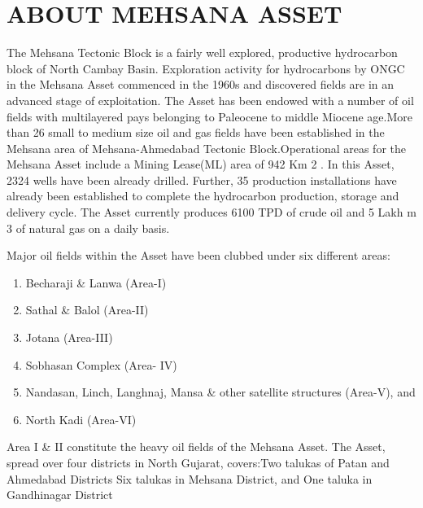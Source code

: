\chapter{ABOUT MEHSANA ASSET}

\onehalfspacing

The Mehsana Tectonic Block is a fairly well explored, productive hydrocarbon block of North Cambay Basin. Exploration activity for hydrocarbons by ONGC in the Mehsana Asset commenced in the 1960s and discovered fields are in an advanced stage of exploitation. The Asset has been endowed with a number of oil fields with multilayered pays belonging to Paleocene to middle Miocene age.More than 26 small to medium size oil and gas fields have been established in the Mehsana area of Mehsana-Ahmedabad Tectonic Block.Operational areas for the Mehsana Asset include a Mining Lease(ML) area of 942 Km 2 . In this Asset, 2324 wells have been already
drilled. Further, 35 production installations have already been established to complete the hydrocarbon production, storage and delivery cycle. The Asset currently produces 6100 TPD of crude oil and 5 Lakh m 3 of natural gas on a daily basis.

\vspace{1em}

\noindent Major oil fields within the Asset have been clubbed under six different areas:

\begin{enumerate}
\item Becharaji \& Lanwa (Area-I)

\item Sathal \& Balol (Area-II)

\item Jotana (Area-III)

\item Sobhasan Complex (Area- IV)

\item Nandasan, Linch, Langhnaj, Mansa \& other satellite structures (Area-V), and

\item North Kadi (Area-VI)

\end{enumerate}

\noindent Area I \& II constitute the heavy oil fields of the Mehsana Asset.
The Asset, spread over four districts in North Gujarat, covers:Two talukas of Patan and Ahmedabad Districts Six talukas in Mehsana District,
and One taluka in Gandhinagar District


